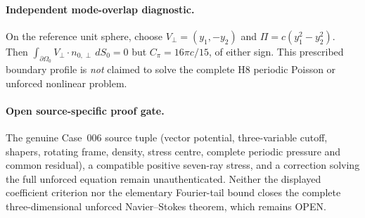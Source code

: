 \paragraph{Independent mode-overlap diagnostic.}
On the reference unit sphere, choose $V_\perp=(y_1,-y_2)$ and $\Pi=c(y_1^2-y_2^2)$. Then $\int_{\partial\Omega_0}V_\perp\cdot n_{0,\perp}\,dS_0=0$ but $C_\pi=16\pi c/15$, of either sign. This prescribed boundary profile is \emph{not} claimed to solve the complete H8 periodic Poisson or unforced nonlinear problem.

\paragraph{Open source-specific proof gate.}
The genuine Case~006 source tuple (vector potential, three-variable cutoff, shapers, rotating frame, density, stress centre, complete periodic pressure and common residual), a compatible positive seven-ray stress, and a correction solving the full unforced equation remain unauthenticated. Neither the displayed coefficient criterion nor the elementary Fourier-tail bound closes the complete three-dimensional unforced Navier--Stokes theorem, which remains OPEN.
